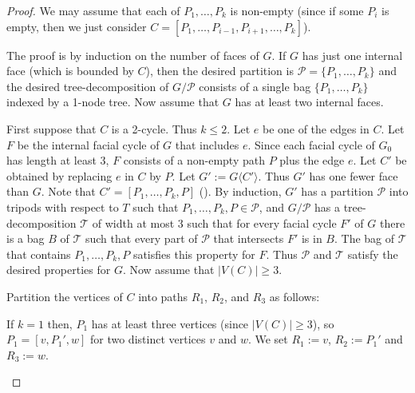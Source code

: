 \documentclass{patmorin}
\newcommand{\note}[2]{\noindent{\color{red}[#1:~#2]}}
\newcommand{\TT}{\mathcal{T}}
\newcommand{\PP}{\mathcal{P}}
\renewcommand{\geq}{\geqslant}
\renewcommand{\leq}{\leqslant}
\begin{document}
\begin{proof}
We may assume that each of $P_1,\dots,P_k$ is non-empty (since if some $P_i$ is empty, then we just consider $C=[P_1,\dots,P_{i-1},P_{i+1},\dots,P_k]$).

The proof is by induction on the number of faces of $G$. If $G$ has just one internal face (which is bounded by $C$), then the desired partition is $\PP=\{P_1,\ldots,P_k\}$ and the desired tree-decomposition of $G/\PP$ consists of a single bag $\{P_1,\ldots,P_k\}$ indexed by a 1-node tree. Now assume that $G$ has at least two internal faces.

First suppose that $C$ is a 2-cycle. Thus $k\leq 2$. Let $e$ be one of the edges in $C$. Let $F$ be the internal facial cycle of $G$ that includes $e$. Since each facial cycle of $G_0$ has length at least 3, $F$ consists of a non-empty path $P$ plus the edge $e$. Let $C'$ be obtained by replacing $e$ in $C$ by $P$. Let $G':=G\langle{C'}\rangle$. Thus $G'$ has one fewer face than $G$. Note that $C'=[P_1,\dots,P_k,P]$ (\note{DW}{or it can be written that way?}).  By induction, $G'$ has a partition $\PP$ into tripods with respect to $T$ such that $P_1,\dots,P_k,P\in\PP$, and $G / \PP$ has a tree-decomposition $\mathcal{T}$ of width at most 3 such that for every facial cycle $F'$ of $G$ there is a bag $B$ of $\mathcal{T}$ such that every part of $\PP$ that intersects $F'$ is in $B$. The bag of $\mathcal{T}$ that contains $P_1,\dots,P_k,P$ satisfies this property for $F$. Thus $\PP$ and $\TT$ satisfy the desired properties for $G$. Now assume that $|V(C)|\geq 3$.



Partition the vertices of $C$ into paths $R_1$, $R_2$, and $R_3$ as follows:
\begin{compactenum}
	\item If $k=1$ then, $P_1$ has at least three vertices (since $|V(C)|\geq 3$), so $P_1=[v, P_1', w]$ for two distinct vertices $v$ and $w$. We set $R_1:=v$, $R_2:=P_1'$ and $R_3:=w$.


\end{compactenum}
\end{proof}
\end{document}
